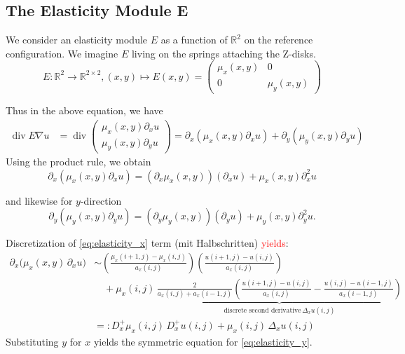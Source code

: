 \subsection*{The Elasticity Module E}
We consider an elasticity module $E$ as a function of $\mathbb{R}^2$ on the reference configuration. We imagine $E$ living on the springs attaching the Z-disks.
\begin{equation*}
	E: \mathbb{R}^2 \rightarrow \mathbb{R}^{2 \times 2}, (x,y) \mapsto E(x,y) = 
	\begin{pmatrix} 
		\mu_x(x,y) & 0 \\
		0 & \mu_y(x,y) 
	\end{pmatrix}
\end{equation*}

Thus in the above equation, we have
\begin{align*}
	\operatorname{div} E \nabla u &= \operatorname{div} 
	\begin{pmatrix}
		\mu_x(x,y) \partial_x u \\
		\mu_y(x,y) \partial_y u
	\end{pmatrix} 
								  =  \partial_x (\mu_x(x,y) \partial_x u) + \partial_y (\mu_y(x,y) \partial_y u)
\end{align*}
Using the product rule, we obtain
\begin{equation}\label{eq:elasticity_x}
	\partial_x (\mu_x(x,y) \partial_x u) = (\partial_x \mu_x(x,y)) (\partial_x u) + \mu_x(x,y) \partial_{x}^{2} u 
\end{equation}

and likewise for $y$-direction
\begin{equation}\label{eq:elasticity_y}
	\partial_y (\mu_y(x,y) \partial_y u) = (\partial_y \mu_y(x,y)) (\partial_y u) + \mu_y(x,y) \partial_{y}^{2} u.
\end{equation}




Discretization of \eqref{eq:elasticity_x} term (mit Halbschritten) \textcolor{red}{yields}:
\begin{align*}
  \partial_x \bigl(\mu_x(x,y)\, \partial_x u\bigr)
  &\sim \left( \frac{\mu_x(i+1,j) - \mu_x(i,j)}{a_x(i,j)} \right)
        \left( \frac{u(i+1,j) - u(i,j)}{a_x(i,j)} \right) \\
  &\quad + \mu_x(i,j)\, 
        \underbrace{ \frac{2}{a_x(i,j) + a_x(i-1,j)} \left( \frac{u(i+1,j) - u(i,j)}{a_x(i,j)}
                         - \frac{u(i,j) - u(i-1,j)}{a_x(i-1,j)} \right)}
        _{\text{discrete second derivative} \, \Delta_x u(i,j)} \\
  &=: D_x^+ \mu_x(i,j)\, D_x^+ u(i,j) + \mu_x(i,j)\, \Delta_x u(i,j)
\end{align*}
Substituting $y$ for $x$ yields the symmetric equation for \eqref{eq:elasticity_y}.


